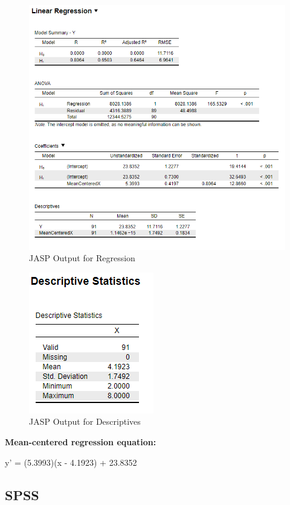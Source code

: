 \documentclass[
]{book}
\begin{document}
\begin{figure}[!h]
\includegraphics{Screenshots/Regression/RegressionJASP} \caption{\label{fig:RegressionJASP}JASP Output for Regression}\label{fig:RegressionJASP}
\end{figure}

\begin{figure}[!h]
\includegraphics{Screenshots/Regression/RegressionJASPmeans} \caption{\label{fig:RegressionJASPmeans}JASP Output for Descriptives}\label{fig:RegressionJASPmeans}
\end{figure}

\textbf{Mean-centered regression equation:}

y' = (5.3993)(x - 4.1923) + 23.8352

\hypertarget{spss-1}{%
\subsection{SPSS}\label{spss-1}}
\end{document}
